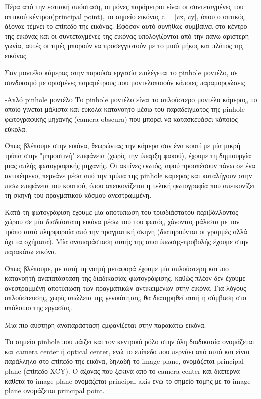 Πέρα από την εστιακή απόσταση, οι μόνες παράμετροι είναι οι συντεταγμένες του οπτικού κέντρου(principal point), το σημείο εικόνας c = [cx, cy], όπου ο οπτικός άξονας τέμνει το επίπεδο της εικόνας. Εφόσον αυτό συνήθως συμβαίνει στο κέντρο της εικόνας και οι συντεταγμένες της εικόνας υπολογίζονται από την πάνω-αριστερή γωνία, αυτές οι τιμές μπορούν να προσεγγιστούν με το μισό μήκος και πλάτος της εικόνας.








Σαν μοντέλο κάμερας στην παρούσα εργασία επιλέγεται το pinhole μοντέλο, σε συνδυασμό με ορισμένες παραμέτρους που μοντελοποιούν κάποιες παραμορφώσεις.

-Απλό pinhole μοντέλο
Το pinhole μοντέλο είναι το απλούστερο μοντέλο κάμερας, το οποίο γίνεται μάλιστα και εύκολα κατανοητό μέσω του παραδείγματος της pinhole φωτογραφικής μηχανής (camera obscura) που μπορεί να κατασκευάσει κάποιος εύκολα.

Όπως βλέπουμε στην εικόνα, θεωρώντας την κάμερα σαν ένα κουτί με μία μικρή τρύπα στην "μπροστινή" επιφάνεια (χωρίς την ύπαρξη φακού), έχουμε τη δημιουργία μιας απλής φωτογραφικής μηχανής. Οι ακτίνες φωτός, αφού προσπέσουν πάνω σε ένα αντικέιμενο, περνάνε μέσα από την τρύπα της pinhole καμερας και καταλήγουν στην πισω επιφάνεια του κουτιού, όπου απεικονίζεται η τελική φωτογραφία που απεικονίζει τη σκηνή του πραγματικού κόσμου ανεστραμμένη.

Κατά τη φωτογράφιση έχουμε μία αποτύπωση του τρισδιάστατου περιβάλλοντος χώρου σε μία δισδιάστατη εικόνα μέσω του του φωτός, χάνοντας μάλιστα με τον τρόπο αυτό πληρφοροία από την πραγματική σκηνη (διατηρούνται οι γραμμές αλλά όχι τα σχήματα). Μία αναπαράσταση αυτής της αποτύπωσης-προβολής έχουμε στην παρακάτω εικόνα.


Όπως βλέπουμε, με αυτή τη νοητή μεταφορά έχουμε μία απλούστερη και πιο κατανοητή αναπατάσταση της διαδικασίας φωτογράφισης, καθώς πλέον δεν έχουμε ανεστραμμένη αποτύπωση των πραγματικών αντικειμένων στην εικόνα. Για λόγους απλούστευσης, χωρίς απώλεια της γενικότητας, θα διατηρηθεί αυτή η σύμβαση στο υπόλοιπο της εργασίας.

Μία πιο αυστηρή αναπαράσταση εμφανίζεται στην παρακάτω εικόνα.

Το σημείο pinhole που πάιζει και τον κεντρικό ρόλο στην όλη διαδικασία ονομάζεται και camera center ή optical center, ενώ το επίπεδο που περνάει από αυτό και είναι παράλληλο στο επίπεδο της εικόνα, δηλαδή το image plane, ονομάζεται principal plane (επίπεδο XCY). Ό άξονας που ξεκινά από το camera center και διαπερνά κάθετα το image plane ονομάζεται principal axis ενώ το σημείο τομής με το image plane ονομάζεται principal point.

